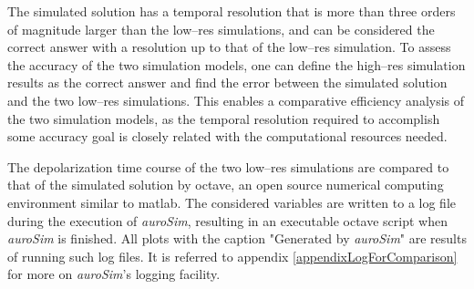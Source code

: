 	The simulated solution has a temporal resolution that is more than three orders of magnitude larger than the low--res simulations, and can be considered the correct answer %
		with a resolution up to that of the low--res simulation. %
	To assess the accuracy of the two simulation models, one can define the high--res simulation results as the correct answer and find the error between the simulated solution and the two low--res simulations.
	This enables a comparative efficiency analysis of the two simulation models, as the temporal resolution required to accomplish some accuracy goal is closely related with the computational resources needed.

	The depolarization time course of the two low--res simulations are compared to that of the simulated solution by octave, an open source numerical computing environment similar to matlab.
	The considered variables are written to a log file during the execution of \emph{auroSim}, resulting in an executable octave script when \emph{auroSim} is finished.
	All plots with the caption "Generated by \emph{auroSim}" are results of running such log files. %
	It is referred to appendix \ref{appendixLogForComparison} for more on \emph{auroSim}'s logging facility.


